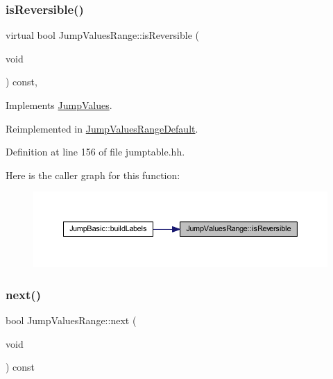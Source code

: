 \subsubsection{\texorpdfstring{isReversible()}{isReversible()}}
{\footnotesize\ttfamily virtual bool Jump\+Values\+Range\+::is\+Reversible (\begin{DoxyParamCaption}\item[{void}]{ }\end{DoxyParamCaption}) const\hspace{0.3cm}{\ttfamily [inline]}, {\ttfamily [virtual]}}



Implements \mbox{\hyperlink{class_jump_values_a7cd231f94b261ef9a426619cae01d764}{Jump\+Values}}.



Reimplemented in \mbox{\hyperlink{class_jump_values_range_default_ae8a65769bf7dbc7f257725c4cf755aa9}{Jump\+Values\+Range\+Default}}.



Definition at line 156 of file jumptable.\+hh.

Here is the caller graph for this function\+:
\nopagebreak
\begin{figure}[H]
\begin{center}
\leavevmode
\includegraphics[width=350pt]{class_jump_values_range_adeedbb8db9a84ff0422e61dcb76848fe_icgraph}
\end{center}
\end{figure}
\mbox{\label{class_jump_values_range_a1738552386fc802eaf6326a439c66bba}} 
\subsubsection{\texorpdfstring{next()}{next()}}
{\footnotesize\ttfamily bool Jump\+Values\+Range\+::next (\begin{DoxyParamCaption}\item[{void}]{ }\end{DoxyParamCaption}) const\hspace{0.3cm}{\ttfamily [virtual]}}




